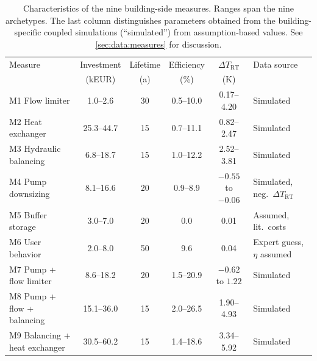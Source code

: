 \begin{table}[htbp]
\centering
\caption{Characteristics of the nine building-side measures. Ranges span the nine archetypes. The last column distinguishes parameters obtained from the building-specific coupled simulations (``simulated'') from assumption-based values. See \cref{sec:data:measures} for discussion.}
\label{tab:measures}
\footnotesize
\begin{tabularx}{\textwidth}{Xcccc>{\raggedright\arraybackslash}p{2.4cm}}
\toprule
Measure & Investment & Lifetime & Efficiency & $\Delta T_{\mathrm{RT}}$ & Data source \\
 & (kEUR) & (a) & (\%) & (K) & \\
\midrule
M1 Flow limiter & 1.0--2.6 & 30 & 0.5--10.0 & 0.17--4.20 & Simulated \\
M2 Heat exchanger & 25.3--44.7 & 15 & 0.7--11.1 & 0.82--2.47 & Simulated \\
M3 Hydraulic balancing & 6.8--18.7 & 15 & 1.0--12.2 & 2.52--3.81 & Simulated \\
M4 Pump downsizing & 8.1--16.6 & 20 & 0.9--8.9 & $-0.55$ to $-0.06$ & Simulated, neg.\ $\Delta T_{\mathrm{RT}}$ \\
M5 Buffer storage & 3.0--7.0 & 20 & 0.0 & 0.01 & Assumed, lit.\ costs \\
M6 User behavior & 2.0--8.0 & 50 & 9.6 & 0.04 & Expert guess, $\eta$ assumed \\
M7 Pump + flow limiter & 8.6--18.2 & 20 & 1.5--20.9 & $-0.62$ to $1.22$ & Simulated \\
M8 Pump + flow + balancing & 15.1--36.0 & 15 & 2.0--26.5 & 1.90--4.93 & Simulated \\
M9 Balancing + heat exchanger & 30.5--60.2 & 15 & 1.4--18.6 & 3.34--5.92 & Simulated \\
\bottomrule
\end{tabularx}
\end{table}
